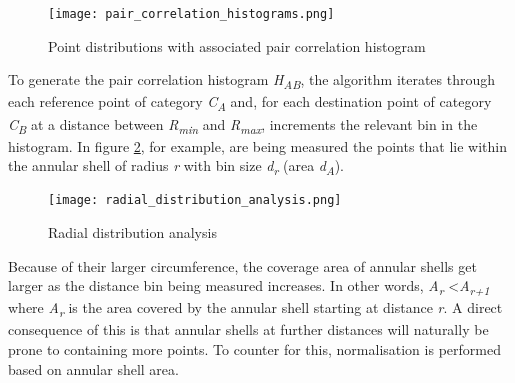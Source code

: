 \begin{figure}[h]
  \centering
	\texttt{[image: pair\_correlation\_histograms.png]}
	\caption{Point distributions with associated pair correlation histogram \cite{Emilien2014}}
	\label{fig:pair_correlation_histograms}
\end{figure}

To generate the pair correlation histogram \textit{H\textsubscript{AB}}, the algorithm iterates through each reference point of category \textit{C\textsubscript{A}} and, for each destination point of category \textit{C\textsubscript{B}} at a distance between \textit{R\textsubscript{min}} and \textit{R\textsubscript{max}}, increments the relevant bin in the histogram. In figure \ref{fig:radial_distribution_analysis_example}, for example, are being measured the points that lie within the annular shell of radius \textit{r} with bin size \textit{d\textsubscript{r}} (area \textit{d\textsubscript{A}}). 

\begin{figure}[h]
  \centering
	\texttt{[image: radial\_distribution\_analysis.png]}
	\caption{Radial distribution analysis}
	\label{fig:radial_distribution_analysis_example}
\end{figure}

Because of their larger circumference, the coverage area of annular shells get larger as the distance bin being measured increases. In other words, \textit{A\textsubscript{r}} \textless \textit{A\textsubscript{r+1}} where \textit{A\textsubscript{r}} is the area covered by the annular shell starting at distance \textit{r}. A direct consequence of this is that annular shells at further distances will naturally be prone to containing more points. To counter for this, normalisation is performed based on annular shell area. \\

